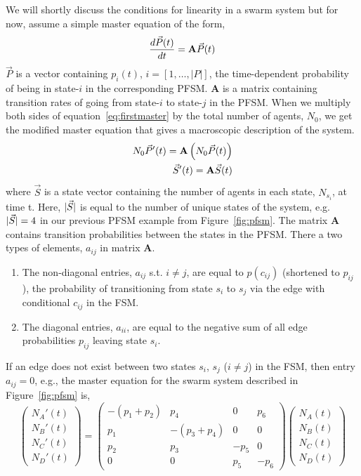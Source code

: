 \documentclass[Main.tex]{subfiles}
\begin{document}
We will shortly discuss the conditions for linearity in a swarm system but for now, assume a simple master equation of the form,
\begin{equation}
\frac{d\vec{P}(t)}{dt} = \mathbf{A}\vec{P}(t)\label{eq:firstmaster}
\end{equation}
$\vec{P}$ is a vector containing $p_i(t)$, $i = [1, \ldots, |P|]$, the time-dependent probability of being in state-$i$ in the corresponding PFSM. $\mathbf{A}$ is a matrix containing transition rates of going from state-$i$ to state-$j$ in the PFSM. When we multiply both sides of equation~\eqref{eq:firstmaster} by the total number of agents, $N_0$, we get the modified master equation that gives a macroscopic description of the system.
\begin{align}
N_0 \vec{P}'(t) = \mathbf{A}\left(N_0\vec{P}(t)\right)\notag\\
\vec{S}'(t) = \mathbf{A}\vec{S}(t)\label{eq:master}
\end{align}
where $\vec{S}$ is a state vector containing the number of agents in each state, $N_{s_i}$, at time t. Here, $\lvert\vec{S}\rvert$ is equal to the number of unique states of the system, e.g. $\lvert\vec{S}\rvert = 4$ in our previous PFSM example from Figure~\ref{fig:pfsm}. The matrix $\mathbf{A}$ contains transition probabilities between the states in the PFSM. There a two types of elements, $a_{ij}$ in matrix $\mathbf{A}$.
\begin{enumerate}
\item The non-diagonal entries, $a_{ij}$ s.t. $i\not=j$, are equal to $p(c_{ij})$ (shortened to $p_{ij}$), the probability of transitioning from state $s_i$ to $s_j$ via the edge with conditional $c_{ij}$ in the FSM.
\item The diagonal entries, $a_{ii}$, are equal to the negative sum of all edge probabilities $p_{ij}$ leaving state $s_i$.
\end{enumerate} 
If an edge does not exist between two states $s_i$, $s_j$ ($i\not=j$) in the FSM, then entry $a_{ij} = 0$, e.g., the master equation for the swarm system described in Figure~\ref{fig:pfsm} is,
\begin{equation}\label{eq:mastereqns}
\left(
	\begin{array}{c}N_A'(t) \\ N_B'(t) \\ N_C'(t) \\ N_D'(t)\end{array}
\right) =
\left(
	\begin{array}{cccc}
	-(p_1 + p_2) & p_4 & 0 & p_6\\
	p_1 & -(p_3 + p_4) & 0 & 0\\
	p_2 & p_3 & -p_5 & 0\\
	0 & 0 & p_5 & -p_6
	\end{array}
\right)
\left(\begin{array}{c}N_A(t) \\ N_B(t) \\ N_C(t) \\ N_D(t)\end{array}\right)
\end{equation}
\end{document}
